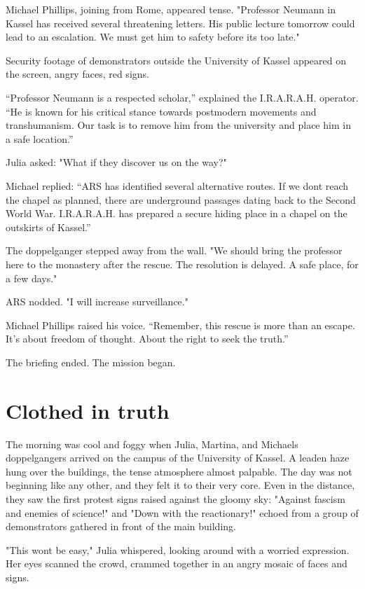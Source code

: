 \documentclass[
]{article}
\begin{document}
Michael Phillips, joining from Rome, appeared tense. "Professor Neumann in Kassel has received several threatening letters. His public lecture tomorrow could lead to an escalation. We must get him to safety before it\textquotesingle s too late."

Security footage of demonstrators outside the University of Kassel appeared on the screen, angry faces, red signs.

``Professor Neumann is a respected scholar,'' explained the I.R.A.R.A.H. operator. ``He is known for his critical stance towards postmodern movements and transhumanism. Our task is to remove him from the university and place him in a safe location.''

Julia asked: "What if they discover us on the way?"

Michael replied: ``ARS has identified several alternative routes. If we don\textquotesingle t reach the chapel as planned, there are underground passages dating back to the Second World War. I.R.A.R.A.H. has prepared a secure hiding place in a chapel on the outskirts of Kassel.''

The doppelganger stepped away from the wall. "We should bring the professor here to the monastery after the rescue. The resolution is delayed. A safe place, for a few days."

ARS nodded. "I will increase surveillance."

Michael Phillips raised his voice. ``Remember, this rescue is more than an escape. It's about freedom of thought. About the right to seek the truth.''

The briefing ended. The mission began.

\section{Clothed in truth}\label{clothed-in-truth}

The morning was cool and foggy when Julia, Martina, and Michael\textquotesingle s doppelgangers arrived on the campus of the University of Kassel. A leaden haze hung over the buildings, the tense atmosphere almost palpable. The day was not beginning like any other, and they felt it to their very core. Even in the distance, they saw the first protest signs raised against the gloomy sky: "Against fascism and enemies of science!" and "Down with the reactionary!" echoed from a group of demonstrators gathered in front of the main building.

"This won\textquotesingle t be easy," Julia whispered, looking around with a worried expression. Her eyes scanned the crowd, crammed together in an angry mosaic of faces and signs.
\end{document}
